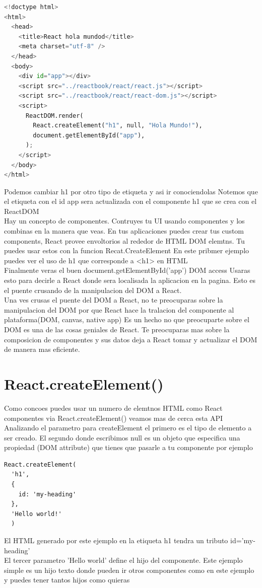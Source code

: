 \begin{lstlisting}[language=python] 
<!doctype html>
<html>
  <head>
    <title>React hola mundod</title>
    <meta charset="utf-8" />
  </head>
  <body>
    <div id="app"></div>
    <script src="../reactbook/react/react.js"></script>
    <script src="../reactbook/react/react-dom.js"></script>
    <script>
      ReactDOM.render(
        React.createElement("h1", null, "Hola Mundo!"),
        document.getElementById("app"),
      );
    </script>
  </body>
</html>
\end{lstlisting}
Podemos cambiar h1 por otro tipo de etiqueta y asi ir conociendolas
Notemos que el etiqueta con el id app sera actualizada con el componente h1 que se crea con el ReactDOM\\
Hay un concepto de componentes. Contruyes tu UI usando componentes y los combinas en la manera que veas. En tus aplicaciones puedes crear tus custom components, React provee envoltorios al rededor de HTML DOM elemtns. Tu puedes usar estos con la funcion Recat.CreateElement En este pribmer ejemplo puedes ver el uso de h1 que corresponde a <h1> en HTML\\
Finalmente veras el buen document.getElementById('app') DOM access Usaras esto para decirle a React donde sera localisada la aplicacion en la pagina. Esto es el puente crusando de la manipulacion del DOM a React.\\
Una ves crusas el puente del DOM a React, no te preocuparas sobre la manipulacion del DOM por que React hace la tralacion del componente al plataforma(DOM, canvas, native app) Es un hecho no que preocuparte sobre el DOM es una de las cosas geniales de React. Te preocuparas mas sobre la composicion de componentes y sus datos deja a React tomar y actualizar el DOM de manera mas eficiente. 
\section{React.createElement()}
Como concoes puedes usar un numero de elemtnos HTML como React componentes via React.createElement() veamos mas de cerca esta API\\
Analizando el parametro para createElement el primero es el tipo de elemento a ser creado. El segundo donde escribimos null es un objeto que especifica una propiedad (DOM attribute) que tienes que pasarle a tu componente por ejemplo

\begin{lstlisting}[language=html]
  React.createElement(
  'h1',
  {
    id: 'my-heading'
  },
  'Hello world!'
  )
\end{lstlisting}
El HTML generado por este ejemplo en la etiqueta h1 tendra un tributo id='my-heading'\\
El tercer parametro 'Hello world' define el hijo del componente. Este ejemplo simple es un hijo texto donde pueden ir otros componentes como en este ejemplo y puedes tener tantos hijos como quieras

